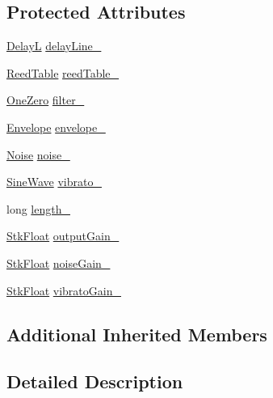 \subsection*{Protected Attributes}
\begin{DoxyCompactItemize}
\item 
\hyperlink{class_nyq_1_1_delay_l}{DelayL} \hyperlink{class_nyq_1_1_clarinet_a2d7e0e3f660e129d4756ffa3d1603bc2}{delay\+Line\+\_\+}
\item 
\hyperlink{class_nyq_1_1_reed_table}{Reed\+Table} \hyperlink{class_nyq_1_1_clarinet_af86ceed772da449a8474b5056f1da667}{reed\+Table\+\_\+}
\item 
\hyperlink{class_nyq_1_1_one_zero}{One\+Zero} \hyperlink{class_nyq_1_1_clarinet_a25ace60187ecd212a1fbbee690504745}{filter\+\_\+}
\item 
\hyperlink{class_nyq_1_1_envelope}{Envelope} \hyperlink{class_nyq_1_1_clarinet_a672128baef4f390d6ecb17d62ba99d25}{envelope\+\_\+}
\item 
\hyperlink{class_nyq_1_1_noise}{Noise} \hyperlink{class_nyq_1_1_clarinet_a3b7e7e464e270b5de6962821eb2303ce}{noise\+\_\+}
\item 
\hyperlink{class_nyq_1_1_sine_wave}{Sine\+Wave} \hyperlink{class_nyq_1_1_clarinet_a8ab5036b4ce9435444449f5113343566}{vibrato\+\_\+}
\item 
long \hyperlink{class_nyq_1_1_clarinet_a92f56ec34b1dcacfc8ca724961f15e97}{length\+\_\+}
\item 
\hyperlink{namespace_nyq_a044fa20a706520a617bbbf458a7db7e4}{Stk\+Float} \hyperlink{class_nyq_1_1_clarinet_a18bb220af5bc8f3346175b78da6604c7}{output\+Gain\+\_\+}
\item 
\hyperlink{namespace_nyq_a044fa20a706520a617bbbf458a7db7e4}{Stk\+Float} \hyperlink{class_nyq_1_1_clarinet_abe010d4de6b40481e526db661dc3763c}{noise\+Gain\+\_\+}
\item 
\hyperlink{namespace_nyq_a044fa20a706520a617bbbf458a7db7e4}{Stk\+Float} \hyperlink{class_nyq_1_1_clarinet_a78100db09c721747284d2518ba7d1ef4}{vibrato\+Gain\+\_\+}
\end{DoxyCompactItemize}
\subsection*{Additional Inherited Members}


\subsection{Detailed Description}


